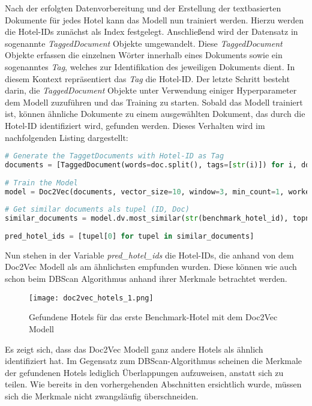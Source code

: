 Nach der erfolgten Datenvorbereitung und der Erstellung der textbasierten Dokumente für jedes Hotel kann das Modell nun trainiert werden. Hierzu werden die Hotel-IDs zunächst als Index festgelegt. Anschließend wird der Datensatz in sogenannte \emph{TaggedDocument} Objekte umgewandelt. Diese \emph{TaggedDocument} Objekte erfassen die einzelnen Wörter innerhalb eines Dokuments sowie ein sogenanntes \emph{Tag}, welches zur Identifikation des jeweiligen Dokuments dient. In diesem Kontext repräsentiert das \emph{Tag} die Hotel-ID. Der letzte Schritt besteht darin, die \emph{TaggedDocument} Objekte unter Verwendung einiger Hyperparameter dem Modell zuzuführen und das Training zu starten. Sobald das Modell trainiert ist, können ähnliche Dokumente zu einem ausgewählten Dokument, das durch die Hotel-ID identifiziert wird, gefunden werden.
\newline
\newline
Dieses Verhalten wird im nachfolgenden Listing dargestellt:
\begin{lstlisting}[language=Python, label=lst:doc2vec_exe, caption=Ausführung des Doc2Vec Modell]
# Generate the TaggetDocuments with Hotel-ID as Tag
documents = [TaggedDocument(words=doc.split(), tags=[str(i)]) for i, doc in doc2vec_df["doc"].iteritems()]
    
# Train the Model
model = Doc2Vec(documents, vector_size=10, window=3, min_count=1, workers=4, epochs=1000, alpha=0.01)
    
# Get similar documents als tupel (ID, Doc)
similar_documents = model.dv.most_similar(str(benchmark_hotel_id), topn=4)
    
pred_hotel_ids = [tupel[0] for tupel in similar_documents]
\end{lstlisting}

Nun stehen in der Variable \emph{pred\_hotel\_ids} die Hotel-IDs, die anhand von dem Doc2Vec Modell als am ähnlichsten empfunden wurden. Diese können wie auch schon beim DBScan Algorithmus anhand ihrer Merkmale betrachtet werden.

\begin{figure}[h]
    \centering
    \texttt{[image: doc2vec\_hotels\_1.png]}
    \caption[Gefundene Hotels für das erste Benchmark-Hotel mit dem Doc2Vec Modell]{Gefundene Hotels für das erste Benchmark-Hotel mit dem Doc2Vec Modell}
    \label{img:doc2vec_hotels_1}
\end{figure}

Es zeigt sich, dass das Doc2Vec Modell ganz andere Hotels als ähnlich identifiziert hat. Im Gegensatz zum DBScan-Algorithmus scheinen die Merkmale der gefundenen Hotels lediglich Überlappungen aufzuweisen, anstatt sich zu teilen. Wie bereits in den vorhergehenden Abschnitten ersichtlich wurde, müssen sich die Merkmale nicht zwangsläufig überschneiden.

